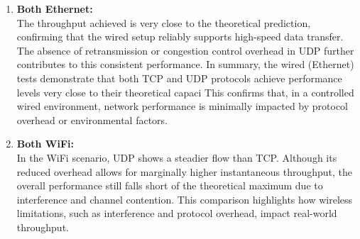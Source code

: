         \begin{enumerate}

            \item \textbf{Both Ethernet:} \\
                The throughput achieved is very close to the theoretical prediction, confirming that the wired setup reliably supports high-speed data transfer.  The absence of retransmission or congestion control overhead in UDP further contributes to this consistent performance. In summary, the wired (Ethernet) tests demonstrate that both TCP and UDP protocols achieve performance levels very close to their theoretical capaci This confirms that, in a controlled wired environment, network performance is minimally impacted by protocol overhead or environmental factors.

            \item \textbf{Both WiFi:} \\
                In the WiFi scenario, UDP shows a steadier flow than TCP. Although its reduced overhead allows for marginally higher instantaneous throughput, the overall performance still falls short of the theoretical maximum due to interference and channel contention. This comparison highlights how wireless limitations, such as interference and protocol overhead, impact real-world throughput.


\end{enumerate}
